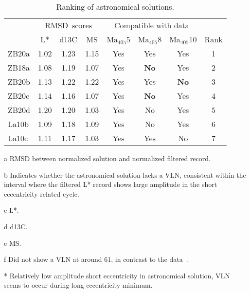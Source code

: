 \documentclass[draft]{agujournal2019}
\newcommand{\appr}{\raise.17ex\hbox{\(\scriptstyle\sim\)}} %
\newcommand{\ma}[1]{Ma\(_{405}\)#1} %
\begin{document}
\begin{table}
\begin{threeparttable}
\caption{
Ranking of astronomical solutions.
\label{tab:results}}
\centering
\begin{tabular}{lccccccc}
 & \multicolumn{3}{c}{\gls{RMSD}~scores\tnote{a}} & \multicolumn{3}{c}{Compatible with data\tnote{b}} & \\
 & \gls{L*}\tnote{c} & \gls{d13C}\tnote{d} & \gls{MS}\tnote{e} & \ma{5} & \ma{8} & \ma{10} & Rank \\
\hline
ZB20a & 1.02 & 1.23 & 1.15 & Yes & Yes & Yes & 1\\
ZB18a & 1.08 & 1.19 & 1.07 & Yes & \textbf{No} & Yes & 2\\
ZB20b & 1.13 & 1.22 & 1.22 & Yes & Yes & \textbf{No} & 3\\
ZB20c & 1.14 & 1.16 & 1.07 & Yes & \textbf{No} & Yes & 4\\
ZB20d & 1.20 & 1.20 & 1.03 & Yes & No\tnote{*} & Yes & 5\\
La10b & 1.09 & 1.18 & 1.09 & Yes & No\tnote{*} & Yes & 6\tnote{f}\\
La10c & 1.11 & 1.17 & 1.03 & Yes & Yes & No\tnote{*} & 7\tnote{f}\\
\hline
\end{tabular}
\begin{tablenotes}
    \item %
    \item [a] \Acrlong{RMSD} between normalized solution and normalized filtered record.
    \item [b] Indicates whether the astronomical solution lacks a \acrfull{VLN}, consistent within the interval where the filtered \gls{L*} record shows large amplitude in the short eccentricity related cycle.
    \item [c] \Acrfull{L*}.
    \item [d] \Acrfull{d13C}.
    \item [e] \Acrfull{MS}.
    \item [f] Did not show a \gls{VLN} at around \qty{61}{\millionyearago}, in contrast to the data~\cite{ZeebeLourens2022EPSL}.
    \item [*] Relatively low amplitude short eccentricity in astronomical solution, \gls{VLN} seems to occur during long eccentricity minimum.
\end{tablenotes}
\end{threeparttable}
\end{table}
\end{document}
